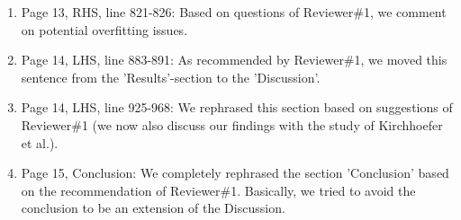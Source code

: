 \documentclass{article}
\begin{document}
\begin{enumerate}
	\item Page 13, RHS, line 821-826: Based on questions of Reviewer\#1, we comment on potential overfitting issues.
	
	\item Page 14, LHS, line 883-891: As recommended by Reviewer\#1, we moved this sentence from the 'Results'-section to the 'Discussion'.
	
	\item Page 14, LHS, line 925-968: We rephrased this section based on suggestions of Reviewer\#1 (we now also discuss our findings with the study of Kirchhoefer et al.).
	
	\item Page 15, Conclusion: We completely rephrased the section 'Conclusion' based on the recommendation of Reviewer\#1. Basically, we tried to avoid the conclusion to be an extension of the Discussion.

\end{enumerate}


\end{document}

